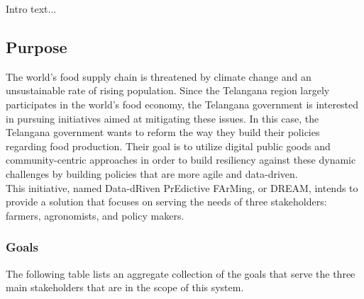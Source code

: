 \setcounter{goals_counter}{1}


Intro text...

\subsection{Purpose}
\begin{flushleft}
The world's food supply chain is threatened by climate change and an unsustainable rate of rising population. Since the Telangana region largely participates in the world's food economy, the Telangana government is interested in pursuing initiatives aimed at mitigating these issues. In this case, the Telangana government wants to reform the way they build their policies regarding food production. Their goal is to utilize digital public goods and community-centric approaches in order to build resiliency against these dynamic challenges by building policies that are more agile and data-driven. 
\smallskip\\
This initiative, named Data-dRiven PrEdictive FArMing, or DREAM, intends to provide a solution that focuses on serving the needs of three stakeholders: farmers, agronomists, and policy makers.  %
\end{flushleft}
\subsubsection{Goals}
The following table lists an aggregate collection of the goals that serve the three main stakeholders that are in the scope of this system.


